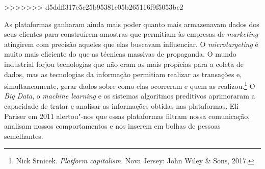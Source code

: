 >>>>>>> d5ddff317e5c25b95381e05b265116f9f5053bc2

As plataformas ganharam ainda mais poder quanto mais armazenavam dados
dos seus clientes para construírem amostras que permitiam às empresas de
\emph{marketing} atingirem com precisão aqueles que elas buscavam influenciar.
O \emph{microtargeting} é muito mais eficiente do que as técnicas massivas de
propaganda. O mundo industrial forjou tecnologias que não eram as mais
propícias para a coleta de dados, mas as tecnologias da informação
permitiam realizar as transações e, simultaneamente, gerar dados sobre
como elas ocorreram e quem as realizou.\footnote{Nick Srnicek. \emph{Platform capitalism}. Nova Jersey: John Wiley \& Sons, 2017.} O \emph{Big Data},
o \emph{machine learning} e os sistemas algoritmos preditivos aprimoraram a
capacidade de tratar e analisar as informações obtidas nas plataformas.
Eli Pariser em 2011 alertou"-nos que essas plataformas filtram nossa
comunicação, analisam nossos comportamentos e nos inserem em bolhas de
pessoas semelhantes.

